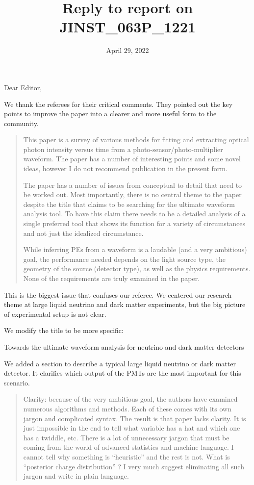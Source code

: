 \documentclass[12pt]{article}
\title{Reply to report on JINST\_063P\_1221}
\date{April 29, 2022}
\begin{document}
\maketitle
Dear Editor,

We thank the referees for their critical comments.  They pointed out the key points to improve the paper into a clearer and more useful form to the community.

\begin{quote}
This paper is a survey of various methods for fitting and extracting optical photon intensity versus time from a photo-sensor/photo-multiplier waveform. The paper has a number of interesting points and some novel ideas, however I do not recommend publication in the present form.

The paper has a number of issues from conceptual to detail that need to be worked out. Most importantly, there is no central theme to the paper despite the title that claims to be searching for the ultimate waveform analysis tool. To have this claim there needs to be a detailed analysis of a single preferred tool that shows its function for a variety of circumstances and not just the idealized circumstance.

While inferring PEs from a waveform is a laudable (and a very ambitious) goal, the performance needed depends on the light source type, the geometry of the source (detector type), as well as the physics requirements. None of the requirements are truly examined in the paper.
\end{quote}

This is the biggest issue that confuses our referee.  We centered our research theme at large liquid neutrino and dark matter experiments, but the big picture of experimental setup is not clear.

We modify the title to be more specific:

Towards the ultimate waveform analysis for neutrino and dark matter detectors

We added a section to describe a typical large liquid neutrino or dark matter detector.  It clarifies which output of the PMTs are the most important for this scenario.

\begin{quote}
Clarity: because of the very ambitious goal, the authors have examined numerous algorithms and methods. Each of these comes with its own jargon and complicated syntax. The result is that paper lacks clarity. It is just impossible in the end to tell what variable has a hat and which one has a twiddle, etc. There is a lot of unnecessary jargon that must be coming from the world of advanced statistics and machine language. I cannot tell why something is ``heuristic'' and the rest is not. What is ``posterior charge distribution'' ? I very much suggest eliminating all such jargon and write in plain language.
\end{quote}
\end{document}
